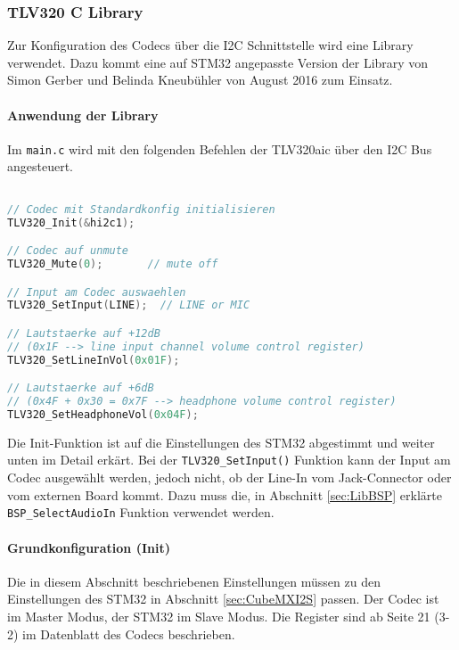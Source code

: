 \subsubsection{TLV320 C Library}
\label{sec:Library_tlv320}

Zur Konfiguration des Codecs über die I2C Schnittstelle wird eine Library verwendet.
Dazu kommt eine auf STM32 angepasste Version der Library von Simon Gerber und Belinda Kneubühler von August 2016 zum Einsatz.

\paragraph{Anwendung der Library}

Im \texttt{main.c} wird mit den folgenden Befehlen der TLV320aic über den I2C Bus angesteuert.

\begin{lstlisting}[language=c]

// Codec mit Standardkonfig initialisieren
TLV320_Init(&hi2c1);

// Codec auf unmute
TLV320_Mute(0);       // mute off

// Input am Codec auswaehlen
TLV320_SetInput(LINE);  // LINE or MIC

// Lautstaerke auf +12dB  
// (0x1F --> line input channel volume control register)
TLV320_SetLineInVol(0x01F);

// Lautstaerke auf +6dB 
// (0x4F + 0x30 = 0x7F --> headphone volume control register)
TLV320_SetHeadphoneVol(0x04F);

\end{lstlisting}

Die Init-Funktion ist auf die Einstellungen des STM32 abgestimmt und weiter unten im Detail erkärt. 
Bei der \texttt{TLV320\_SetInput()} Funktion kann der Input am Codec ausgewählt werden, jedoch nicht, ob der Line-In vom Jack-Connector oder vom externen Board kommt. 
Dazu muss die, in Abschnitt \ref{sec:LibBSP} erklärte \texttt{BSP\_SelectAudioIn} Funktion verwendet werden.


\paragraph{Grundkonfiguration (Init)}

Die in diesem Abschnitt beschriebenen Einstellungen müssen zu den Einstellungen des STM32 in Abschnitt \ref{sec:CubeMXI2S} passen. Der Codec ist im Master Modus, der STM32 im Slave Modus. Die Register sind ab Seite 21 (3-2) im Datenblatt des Codecs beschrieben. \cite{tlv320}

